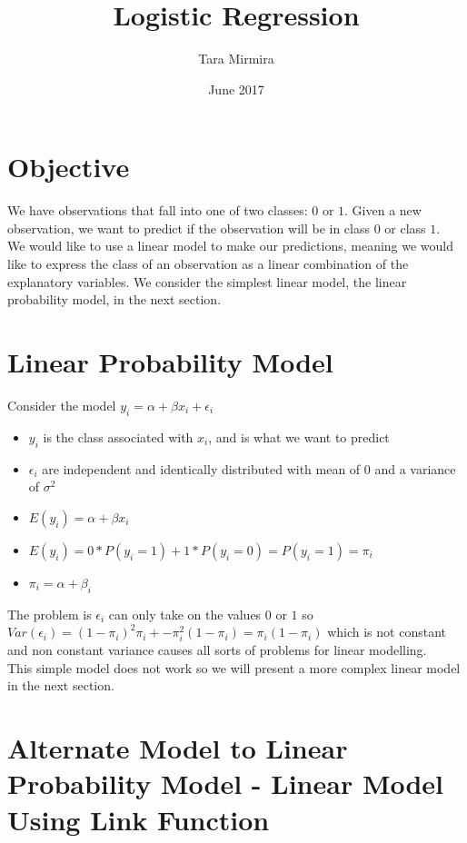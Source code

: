\documentclass{article}
\title{Logistic Regression}
\author{Tara Mirmira }
\date{June 2017}
\begin{document}
\maketitle

\section{Objective}

We have observations that fall into one of two classes: $0$ or $1$. Given a new observation, we want to predict if the observation will be in class $0$ or class $1$. \\

\noindent We would like to use a linear model to make our predictions, meaning we would like to express the class of an observation as a linear combination of the explanatory variables. We consider the simplest linear model, the linear probability model, in the next section.

\section{Linear Probability Model}

Consider the model $y_i = \alpha + \beta x_i + \epsilon_i$


\begin{itemize}
    \item $y_i$ is the class associated with $x_i$, and is what we want to predict
    \item $\epsilon_i$ are independent and identically distributed with mean of $0$ and a variance of $\sigma^2$
    \item $E(y_i) = \alpha + \beta x_i$
    \item $E(y_i) = 0 * P(y_i = 1) + 1*P(y_i = 0) = P(y_i = 1) = \pi_i$
    \item $\pi_i = \alpha + \beta_i$
\end{itemize}

\noindent The problem is $\epsilon_i$ can only take on the values $0$ or $1$ so $Var(\epsilon_i) = (1 - \pi_i)^2 \pi_i + -\pi_i^2(1 - \pi_i) = \pi_i(1-\pi_i)$ which is not constant and non constant variance causes all sorts of problems for linear modelling.\\

\noindent This simple model does not work so we will present a more complex linear model in the next section.

\section{Alternate Model to Linear Probability Model - Linear Model Using Link Function}
\end{document}
